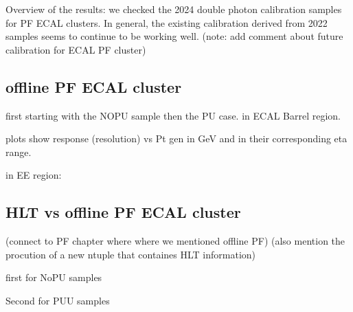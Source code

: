 Overview of the results: we checked the 2024 double photon calibration samples for PF ECAL clusters. In general, the existing calibration derived from 2022 samples seems to continue to be working well. (note: add comment about future calibration for ECAL PF cluster)


\subsection{offline PF ECAL cluster}

first starting with the NOPU sample then the PU case. in ECAL Barrel region. 

plots show response (resolution) vs Pt gen in GeV and in their corresponding eta range.






in EE region:





\subsection{HLT vs offline PF ECAL cluster}

(connect to PF chapter where where we mentioned offline PF)
(also mention the procution of a new ntuple that containes HLT information) 

first for NoPU samples

Second for PUU samples

